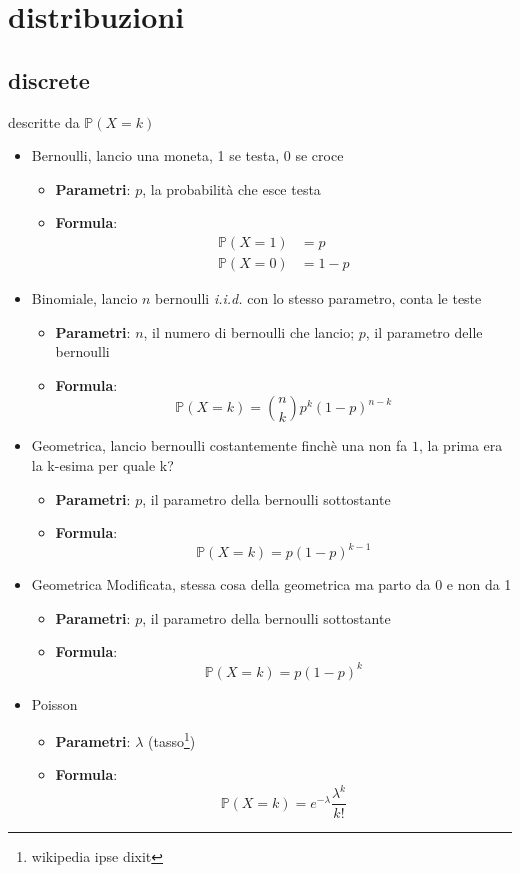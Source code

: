 \documentclass{article}
\begin{document}
\section{distribuzioni}

\subsection{discrete}
descritte da $\mathbb{P}(X = k)$

\begin{itemize}
  \item Bernoulli, lancio una moneta, 1 se testa, 0 se croce
    \begin{itemize}
    \item \textbf{Parametri}: $p$, la probabilità che esce testa
    \item \textbf{Formula}:
      \begin{align*}
        \mathbb{P}(X = 1) &= p \\
        \mathbb{P}(X = 0) &= 1-p
      \end{align*}
    \end{itemize}

  \item Binomiale, lancio $n$ bernoulli \emph{i.i.d.} con lo stesso parametro, conta le teste
    \begin{itemize}
    \item \textbf{Parametri}: $n$, il numero di bernoulli che lancio; $p$, il parametro delle bernoulli
    \item \textbf{Formula}:
      \[ \mathbb{P}(X = k) = \binom{n}{k} p^k {(1-p)}^{n-k} \]
    \end{itemize}

  \item Geometrica, lancio bernoulli costantemente finchè una non fa $1$, la prima era la k-esima per quale k?
    \begin{itemize}
    \item \textbf{Parametri}: $p$, il parametro della bernoulli sottostante
    \item \textbf{Formula}:
      \[ \mathbb{P}(X = k) = p{(1-p)}^{k-1} \]
    \end{itemize}

  \item Geometrica Modificata, stessa cosa della geometrica ma parto da 0 e non da 1
    \begin{itemize}
    \item \textbf{Parametri}: $p$, il parametro della bernoulli sottostante
    \item \textbf{Formula}:
      \[ \mathbb{P}(X = k) = p {(1-p)}^k \]
    \end{itemize}

  \item Poisson
    \begin{itemize}
    \item \textbf{Parametri}: $\lambda$ (tasso\footnote{wikipedia ipse dixit})
    \item \textbf{Formula}:
      \[ \mathbb{P}(X = k) = e^{-\lambda} \frac{\lambda^k}{k!} \]
    \end{itemize}
\end{itemize}
\end{document}
